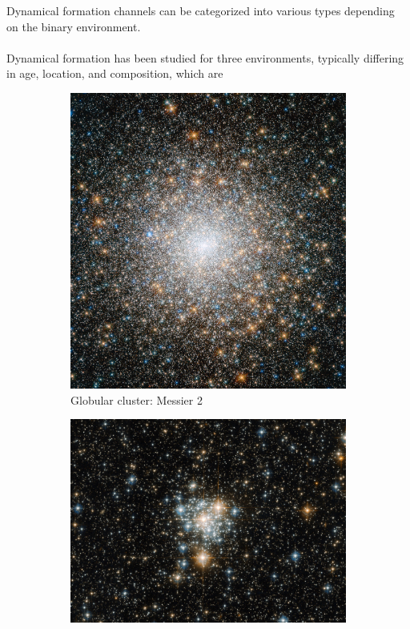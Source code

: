 Dynamical formation channels can be categorized into various types depending on the binary environment.\\

\noindent{}\\

Dynamical formation has been studied for three environments, typically differing in age, location, and composition, which are 

\begin{figure}
\centering
\begin{subfigure}[b]{0.48\textwidth}
  \centering
  \includegraphics[width=\textwidth]{figures/Introduction/messier-15.jpg}
  \caption{Globular cluster: Messier 2}
  \label{fig:globular-cluster}
\end{subfigure}
\hfill
\begin{subfigure}[b]{0.48\textwidth}
  \centering
  \includegraphics[width=\linewidth]{figures/Introduction/NGC-6752-YSC.jpg}

\end{subfigure}
\end{figure}
